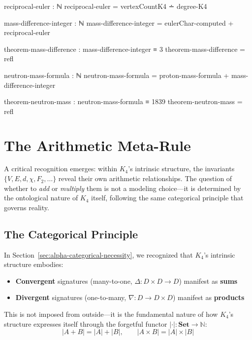 \documentclass[11pt,a4paper]{book}
\begin{document}
\begin{code}
reciprocal-euler : ℕ
reciprocal-euler = vertexCountK4 ∸ degree-K4

mass-difference-integer : ℕ
mass-difference-integer = eulerChar-computed + reciprocal-euler

theorem-mass-difference : mass-difference-integer ≡ 3
theorem-mass-difference = refl

neutron-mass-formula : ℕ
neutron-mass-formula = proton-mass-formula + mass-difference-integer

theorem-neutron-mass : neutron-mass-formula ≡ 1839
theorem-neutron-mass = refl
\end{code}


\chapter{The Arithmetic Meta-Rule}
\label{chap:arithmetic-meta-rule}

A critical recognition emerges: within $K_4$'s intrinsic structure, the invariants $\{V, E, d, \chi, F_2, \ldots\}$ reveal their own arithmetic relationships. The question of whether to \emph{add} or \emph{multiply} them is not a modeling choice—it is determined by the ontological nature of $K_4$ itself, following the same categorical principle that governs reality.

\section{The Categorical Principle}

In Section~\ref{sec:alpha-categorical-necessity}, we recognized that $K_4$'s intrinsic structure embodies:
\begin{itemize}
\item \textbf{Convergent} signatures (many-to-one, $\Delta : D \times D \to D$) manifest as \textbf{sums}
\item \textbf{Divergent} signatures (one-to-many, $\nabla : D \to D \times D$) manifest as \textbf{products}
\end{itemize}

This is not imposed from outside—it is the fundamental nature of how $K_4$'s structure expresses itself through the forgetful functor $|\cdot| : \mathbf{Set} \to \mathbb{N}$:
\[
|A + B| = |A| + |B|, \qquad |A \times B| = |A| \times |B|
\]
\end{document}
